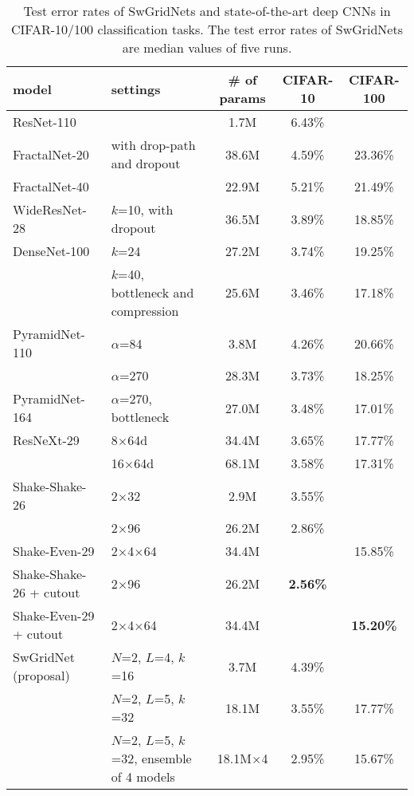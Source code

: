 \documentclass[10pt,twocolumn,letterpaper]{article}
\begin{document}
\begin{table*}
\centering
 \caption{Test error rates of SwGridNets and state-of-the-art deep CNNs in CIFAR-10/100 classification tasks.
 The test error rates of SwGridNets are median values of five runs.}
 \vskip 3pt
 \label{table:result2}
 \begin{tabular}{|l|l|c|c|c|}
  \hline
  model & settings & \# of params & CIFAR-10 & CIFAR-100 \\
  \hline
  ResNet-110~\cite{ResNet} & & 1.7M & 6.43\% & \\
  \hline
  FractalNet-20~\cite{FractalNet} & with drop-path and dropout & 38.6M & 4.59\% & 23.36\% \\
  FractalNet-40 & & 22.9M & 5.21\% & 21.49\% \\
  \hline
  WideResNet-28~\cite{WideResNet} & $k$=10, with dropout & 36.5M & 3.89\% & 18.85\% \\
  \hline
  DenseNet-100~\cite{DenseNet} & $k$=24 & 27.2M & 3.74\% & 19.25\% \\
  & $k$=40, bottleneck and compression & 25.6M & 3.46\% & 17.18\% \\
  \hline
  PyramidNet-110~\cite{PyramidalResNet} & $\alpha$=84 & 3.8M & 4.26\% & 20.66\% \\
  & $\alpha$=270 & 28.3M & 3.73\% & 18.25\% \\
  PyramidNet-164 & $\alpha$=270, bottleneck & 27.0M & 3.48\% & 17.01\% \\
  \hline
  ResNeXt-29~\cite{ResNeXt} & 8$\times$64d & 34.4M & 3.65\% & 17.77\% \\
  & 16$\times$64d & 68.1M & 3.58\% & 17.31\% \\
  \hline 
  Shake-Shake-26~\cite{ShakeNet} & 2$\times$32 & 2.9M & 3.55\% & \\
  & 2$\times$96 & 26.2M & 2.86\% & \\
  Shake-Even-29 & 2$\times$4$\times$64 & 34.4M &  & 15.85\% \\
  \hline 
  Shake-Shake-26 + cutout~\cite{Cutout} & 2$\times$96 & 26.2M & {\bf 2.56\%} & \\
  Shake-Even-29 + cutout & 2$\times$4$\times$64 & 34.4M & & {\bf 15.20\%} \\
  \hline 
  SwGridNet (proposal) & $N$=2, $L$=4, $k$=16 & 3.7M & 4.39\% & \\
  & $N$=2, $L$=5, $k$=32 & 18.1M & 3.55\% & 17.77\% \\
  & $N$=2, $L$=5, $k$=32, ensemble of 4 models& 18.1M$\times$4 & 2.95\% & 15.67\% \\
  \hline 
 \end{tabular} \\ 
\end{table*}
\end{document}
